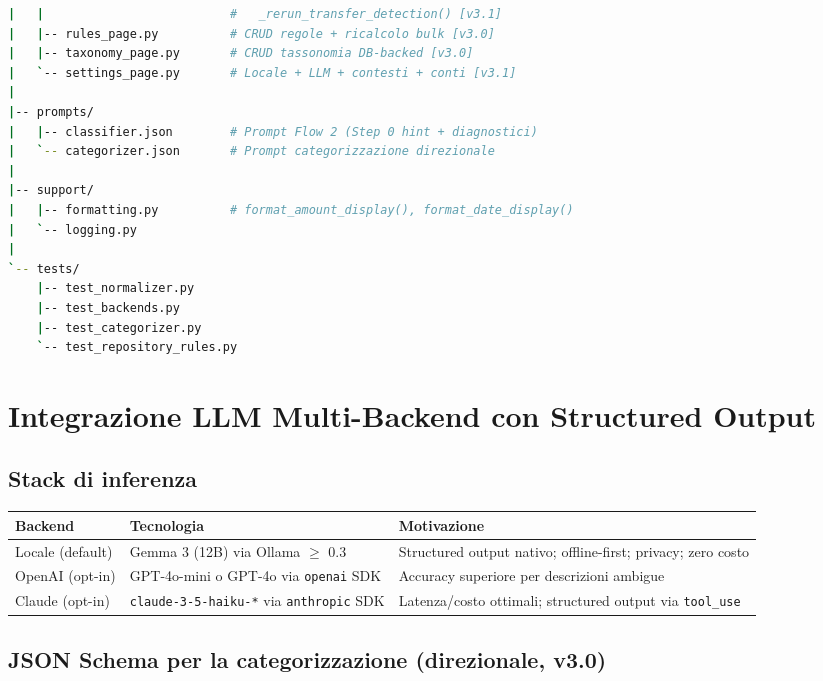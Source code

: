 \documentclass[11pt, a4paper]{article}
\begin{document}
\begin{lstlisting}[language=bash, caption={Struttura directory v3.1}]
|   |                          #   _rerun_transfer_detection() [v3.1]
|   |-- rules_page.py          # CRUD regole + ricalcolo bulk [v3.0]
|   |-- taxonomy_page.py       # CRUD tassonomia DB-backed [v3.0]
|   `-- settings_page.py       # Locale + LLM + contesti + conti [v3.1]
|
|-- prompts/
|   |-- classifier.json        # Prompt Flow 2 (Step 0 hint + diagnostici)
|   `-- categorizer.json       # Prompt categorizzazione direzionale
|
|-- support/
|   |-- formatting.py          # format_amount_display(), format_date_display()
|   `-- logging.py
|
`-- tests/
    |-- test_normalizer.py
    |-- test_backends.py
    |-- test_categorizer.py
    `-- test_repository_rules.py
\end{lstlisting}


\section{Integrazione LLM Multi-Backend con Structured Output}
\label{sec:llm}

\subsection{Stack di inferenza}

\begin{center}
\begin{tabular}{@{}L{3cm} L{4cm} L{6cm}@{}}
\toprule
\textbf{Backend} & \textbf{Tecnologia} & \textbf{Motivazione} \\
\midrule
Locale (default) & Gemma 3 (12B) via Ollama $\geq$ 0.3 &
  Structured output nativo; offline-first; privacy; zero costo \\
OpenAI (opt-in)  & GPT-4o-mini o GPT-4o via \texttt{openai} SDK &
  Accuracy superiore per descrizioni ambigue \\
Claude (opt-in)  & \texttt{claude-3-5-haiku-*} via \texttt{anthropic} SDK &
  Latenza/costo ottimali; structured output via \texttt{tool\_use} \\
\bottomrule
\end{tabular}
\end{center}

\subsection{JSON Schema per la categorizzazione (direzionale, v3.0)}
\end{document}
